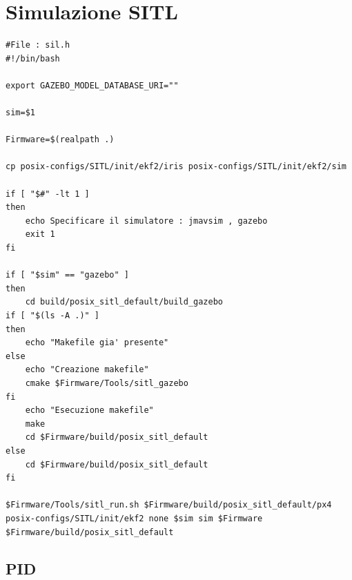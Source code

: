 \section{Simulazione SITL}

\lstset{language=csh}
\begin{lstlisting}
#File : sil.h
#!/bin/bash

export GAZEBO_MODEL_DATABASE_URI=""

sim=$1

Firmware=$(realpath .)

cp posix-configs/SITL/init/ekf2/iris posix-configs/SITL/init/ekf2/sim

if [ "$#" -lt 1 ]
then
	echo Specificare il simulatore : jmavsim , gazebo
	exit 1
fi

if [ "$sim" == "gazebo" ] 
then
	cd build/posix_sitl_default/build_gazebo
if [ "$(ls -A .)" ]
then
	echo "Makefile gia' presente"
else
	echo "Creazione makefile"
	cmake $Firmware/Tools/sitl_gazebo
fi
	echo "Esecuzione makefile"
	make
	cd $Firmware/build/posix_sitl_default
else
	cd $Firmware/build/posix_sitl_default
fi

$Firmware/Tools/sitl_run.sh $Firmware/build/posix_sitl_default/px4  posix-configs/SITL/init/ekf2 none $sim sim $Firmware $Firmware/build/posix_sitl_default
\end{lstlisting}

\subsection{PID}
